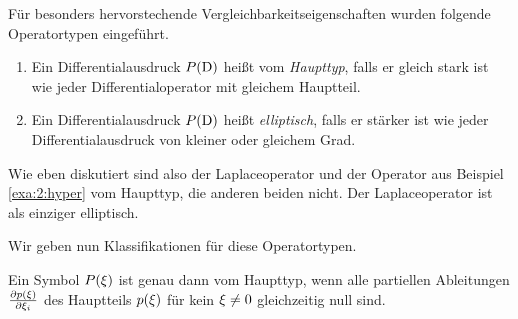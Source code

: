 Für besonders hervorstechende Vergleichbarkeitseigenschaften
wurden folgende Operatortypen eingeführt.

\begin{df}
\begin{enumerate}
\item
Ein Differentialausdruck $P(\mathrm D)$ heißt vom {\em Haupttyp},
falls er gleich stark ist wie jeder Differentialoperator mit gleichem Hauptteil.
\item
Ein Differentialausdruck $P(\mathrm D)$ heißt {\em elliptisch},
falls er stärker ist wie jeder Differentialausdruck von kleiner oder gleichem Grad.
\end{enumerate}
\end{df}

Wie eben diskutiert sind also der Laplaceoperator
und der Operator aus Beispiel \ref{exa:2:hyper} vom Haupttyp,
die anderen beiden nicht.
Der Laplaceoperator ist als einziger elliptisch.

Wir geben nun Klassifikationen
für diese Operatortypen.

\begin{thm}\label{thm:2:2.9}
Ein Symbol $P(\xi)$ ist genau dann vom Haupttyp,
wenn alle partiellen Ableitungen $\frac{\partial p(\xi)}{\partial\xi_i}$
des Hauptteils $p(\xi)$ für kein $\xi\neq0$
gleichzeitig null sind.
\end{thm}

